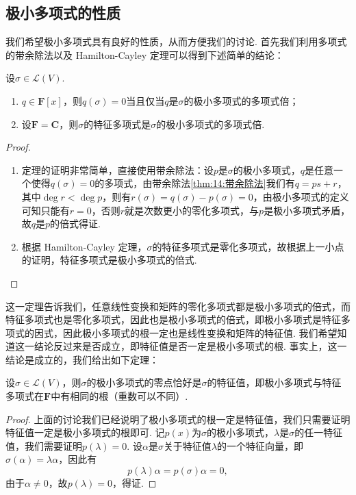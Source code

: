 \subsection{极小多项式的性质}

我们希望极小多项式具有良好的性质，从而方便我们的讨论. 首先我们利用多项式的带余除法以及 Hamilton-Cayley 定理可以得到下述简单的结论：
\begin{theorem}
    设$\sigma\in \mathcal{L}(V)$.
    \begin{enumerate}
        \item $q\in\mathbf{F}[x]$，则$q(\sigma)=0$当且仅当$q$是$\sigma$的极小多项式的多项式倍；

        \item 设$\mathbf{F}=\mathbf{C}$，则$\sigma$的特征多项式是$\sigma$的极小多项式的多项式倍.
    \end{enumerate}
\end{theorem}

\begin{proof}
    \begin{enumerate}
        \item 定理的证明非常简单，直接使用带余除法：设$p$是$\sigma$的极小多项式，$q$是任意一个使得$q(\sigma)=0$的多项式，由带余除法\autoref{thm:14:带余除法}我们有$q=ps+r$，其中$\deg r<\deg p$，则有$r(\sigma)=q(\sigma)-p(\sigma)=0$，由极小多项式的定义可知只能有$r=0$，否则$r$就是次数更小的零化多项式，与$p$是极小多项式矛盾，故$q$是$p$的倍式得证.

        \item 根据 Hamilton-Cayley 定理，$\sigma$的特征多项式是零化多项式，故根据上一小点的证明，特征多项式是极小多项式的倍式.
    \end{enumerate}
\end{proof}

这一定理告诉我们，任意线性变换和矩阵的零化多项式都是极小多项式的倍式，而特征多项式也是零化多项式，因此也是极小多项式的倍式，即极小多项式是特征多项式的因式，因此极小多项式的根一定也是线性变换和矩阵的特征值. 我们希望知道这一结论反过来是否成立，即特征值是否一定是极小多项式的根. 事实上，这一结论是成立的，我们给出如下定理：
\begin{theorem} \label{thm:21:极小多项式与特征多项式相同根}
    设$\sigma\in \mathcal{L}(V)$，则$\sigma$的极小多项式的零点恰好是$\sigma$的特征值，即极小多项式与特征多项式在$\mathbf{F}$中有相同的根（重数可以不同）.
\end{theorem}

\begin{proof}
    上面的讨论我们已经说明了极小多项式的根一定是特征值，我们只需要证明特征值一定是极小多项式的根即可. 记$p(x)$为$\sigma$的极小多项式，$\lambda$是$\sigma$的任一特征值，我们需要证明$p(\lambda)=0$. 设$\alpha$是$\sigma$关于特征值$\lambda$的一个特征向量，即$\sigma(\alpha)=\lambda\alpha$，因此有
    \[p(\lambda)\alpha=p(\sigma)\alpha=0,\]
    由于$\alpha\neq 0$，故$p(\lambda)=0$，得证.
\end{proof}


